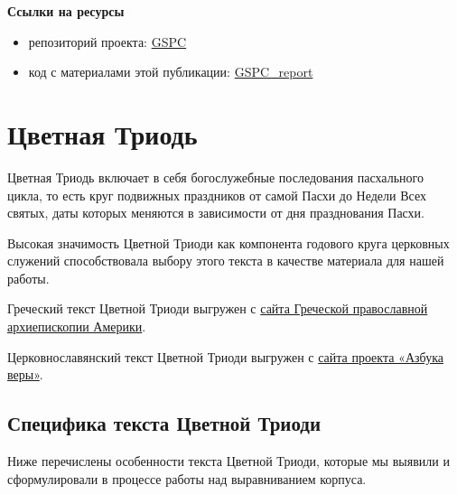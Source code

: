 \documentclass[
  letterpaper,
]{book}
\begin{document}
\begin{tcolorbox}[enhanced jigsaw, toprule=.15mm, colframe=quarto-callout-note-color-frame, colback=white, left=2mm, arc=.35mm, leftrule=.75mm, bottomrule=.15mm, rightrule=.15mm, opacityback=0, breakable]

\textbf{Ссылки на ресурсы}\vspace{2mm}

\begin{itemize}
\item
  репозиторий проекта:
  \href{https://github.com/Drozhzhinastya/GSPC}{GSPC}
\item
  код с материалами этой публикации:
  \href{https://github.com/levshadrin/GSPC_report}{GSPC\_report}
\end{itemize}

\end{tcolorbox}

\hfill\break


\hypertarget{sec-about_pent}{%
\chapter{Цветная Триодь}\label{sec-about_pent}}

Цветная Триодь включает в себя богослужебные последования пасхального
цикла, то есть круг подвижных праздников от самой Пасхи до Недели Всех
святых, даты которых меняются в зависимости от дня празднования Пасхи.

Высокая значимость Цветной Триоди как компонента годового круга
церковных служений способствовала выбору этого текста в качестве
материала для нашей работы.

Греческий текст Цветной Триоди выгружен с
\href{https://glt.goarch.org/\#04}{сайта Греческой православной
архиепископии Америки}.

Церковнославянский текст Цветной Триоди выгружен с
\href{https://azbyka.ru/otechnik/Pravoslavnoe_Bogosluzhenie/triod-tsvetnaja/}{сайта
проекта «Азбука веры»}.

\hypertarget{sec-about_pent_specifics}{%
\section{Специфика текста Цветной
Триоди}\label{sec-about_pent_specifics}}

Ниже перечислены особенности текста Цветной Триоди, которые мы выявили и
сформулировали в процессе работы над выравниванием корпуса.
\end{document}
